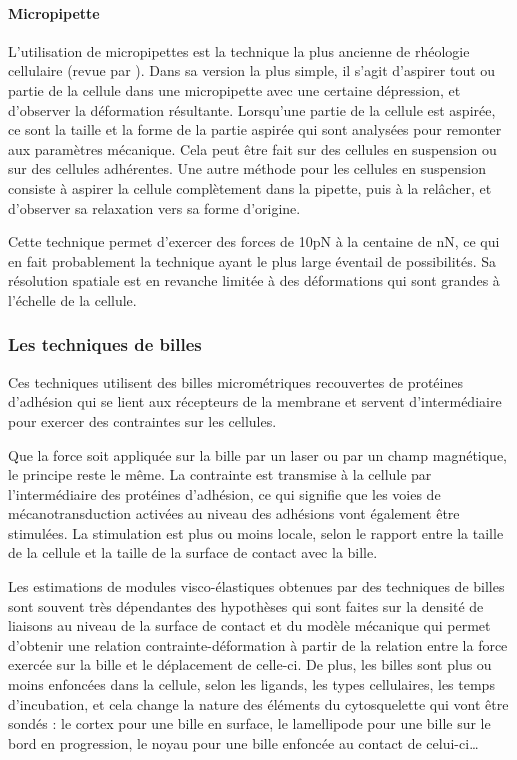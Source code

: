 \documentclass{report}
\begin{document}
\paragraph{Micropipette}

L'utilisation de micropipettes est la technique la plus ancienne de rhéologie cellulaire (revue par \cite{hochmuch}). 
Dans sa version la plus simple, il s'agit d'aspirer tout ou partie de la cellule dans une micropipette avec une certaine dépression, et d'observer la déformation résultante. 
Lorsqu'une partie de la cellule est aspirée, ce sont la taille et la forme de la partie aspirée qui sont analysées pour remonter aux paramètres mécanique. 
Cela peut être fait sur des cellules en suspension ou sur des cellules adhérentes.
Une autre méthode pour les cellules en suspension consiste à aspirer la cellule complètement dans la pipette, puis à la relâcher, et d'observer sa relaxation vers sa forme d'origine. 

 

Cette technique permet d'exercer des forces de 10pN à la centaine de nN, ce qui en fait probablement la technique ayant le plus large éventail de possibilités. Sa résolution spatiale est en revanche limitée à des déformations qui sont grandes à l'échelle de la cellule. 



\subsubsection{Les techniques de billes}
Ces techniques utilisent des billes micrométriques recouvertes de protéines d'adhésion qui se lient aux récepteurs de la membrane et servent d'intermédiaire pour exercer des contraintes sur les cellules. 

Que la force soit appliquée sur la bille par un laser ou par un champ magnétique, le principe reste le même. La contrainte est transmise à la cellule par l'intermédiaire des protéines d'adhésion, ce qui signifie que les voies de mécanotransduction activées au niveau des adhésions vont également être stimulées. 
La stimulation est plus ou moins locale, selon le rapport entre la taille de la cellule et la taille de la surface de contact avec la bille.

Les estimations de modules visco-élastiques obtenues par des techniques de billes sont souvent très dépendantes des hypothèses qui sont faites sur la densité de liaisons au niveau de la surface de contact et du modèle mécanique qui permet d'obtenir une relation contrainte-déformation à partir de la relation entre la force exercée sur la bille et le déplacement de celle-ci. 
De plus, les billes sont plus ou moins enfoncées dans la cellule, selon les ligands, les types cellulaires, les temps d'incubation, et cela change la nature des éléments du cytosquelette qui vont être sondés : le cortex pour une bille en surface, le lamellipode pour une bille sur le bord en progression, le noyau pour une bille enfoncée au contact de celui-ci\dots
\end{document}
